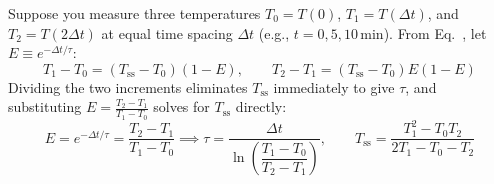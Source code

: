 \begin{derivation}
Suppose you measure three temperatures $T_0 = T(0)$, $T_1 = T(\Delta t)$, and $T_2 = T(2\Delta t)$ at equal time spacing $\Delta t$ (e.g., $t = 0, 5, 10\,\si{\minute}$). From Eq.~, let $E \equiv e^{-\Delta t/\tau}$:
\[
  T_1 - T_0 = \left(T_{\mathrm{ss}} - T_0\right)(1 - E), \qquad T_2 - T_1 = \left(T_{\mathrm{ss}} - T_0\right)E(1 - E)
\]
Dividing the two increments eliminates $T_{\mathrm{ss}}$ immediately to give $\tau$, and substituting $E = \frac{T_2 - T_1}{T_1 - T_0}$ solves for $T_{\mathrm{ss}}$ directly:
\begin{equation}
  \boxed{E = e^{-\Delta t/\tau} = \frac{T_2 - T_1}{T_1 - T_0} \implies \tau = \frac{\Delta t}{\ln\!\left(\dfrac{T_1 - T_0}{T_2 - T_1}\right)}, \qquad T_{\mathrm{ss}} = \frac{T_1^2 - T_0 T_2}{2T_1 - T_0 - T_2}}
  \label{eq:13:three-point-exact}
\end{equation}
\end{derivation}

